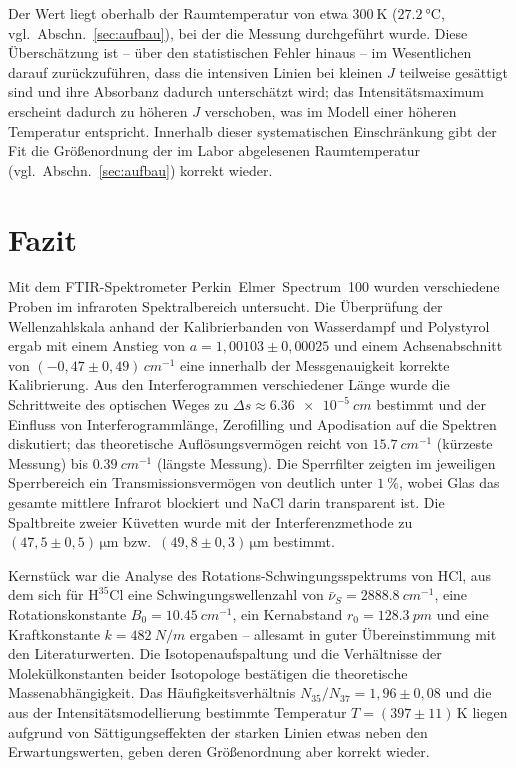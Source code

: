\documentclass[11pt,a4paper]{article}
\begin{document}
Der Wert liegt oberhalb der Raumtemperatur von etwa $\SI{300}{\kelvin}$
($\SI{27.2}{\celsius}$, vgl.\ Abschn.~\ref{sec:aufbau}), bei der die Messung
durchgeführt wurde. Diese Überschätzung ist -- über den statistischen Fehler
hinaus -- im Wesentlichen darauf zurückzuführen, dass die intensiven Linien bei
kleinen $J$ teilweise gesättigt sind und ihre Absorbanz dadurch unterschätzt
wird; das Intensitätsmaximum erscheint dadurch zu höheren $J$ verschoben, was im
Modell einer höheren Temperatur entspricht. Innerhalb dieser systematischen
Einschränkung gibt der Fit die Größenordnung der im Labor abgelesenen
Raumtemperatur (vgl.\ Abschn.~\ref{sec:aufbau}) korrekt wieder.

\section{Fazit}
\label{sec:fazit}

Mit dem FTIR-Spektrometer Perkin~Elmer~Spectrum~100 wurden verschiedene Proben im
infraroten Spektralbereich untersucht. Die Überprüfung der Wellenzahlskala anhand
der Kalibrierbanden von Wasserdampf und Polystyrol ergab mit einem Anstieg von
$a=1{,}00103 \pm 0{,}00025$ und einem Achsenabschnitt von $(-0{,}47\pm0{,}49)\,
\si{cm^{-1}}$ eine innerhalb der Messgenauigkeit korrekte Kalibrierung. Aus den
Interferogrammen verschiedener Länge wurde die Schrittweite des optischen Weges zu
$\Delta s \approx \SI{6.36e-5}{cm}$ bestimmt und der Einfluss von
Interferogrammlänge, Zerofilling und Apodisation auf die Spektren diskutiert; das
theoretische Auflösungsvermögen reicht von $\SI{15.7}{cm^{-1}}$ (kürzeste Messung)
bis $\SI{0.39}{cm^{-1}}$ (längste Messung). Die Sperrfilter zeigten im jeweiligen
Sperrbereich ein Transmissionsvermögen von deutlich unter $\SI{1}{\percent}$,
wobei Glas das gesamte mittlere Infrarot blockiert und NaCl darin transparent ist.
Die Spaltbreite zweier Küvetten wurde mit der Interferenzmethode zu $(47{,}5\pm
0{,}5)\,\si{\micro\metre}$ bzw.\ $(49{,}8\pm0{,}3)\,\si{\micro\metre}$ bestimmt.

Kernstück war die Analyse des Rotations-Schwingungsspektrums von HCl, aus dem sich
für $\mathrm{H}^{35}\mathrm{Cl}$ eine Schwingungswellenzahl von
$\bar\nu_S=\SI{2888.8}{cm^{-1}}$, eine Rotationskonstante $B_0=\SI{10.45}{cm^{-1}}$,
ein Kernabstand $r_0=\SI{128.3}{pm}$ und eine Kraftkonstante $k=\SI{482}{N/m}$
ergaben -- allesamt in guter Übereinstimmung mit den Literaturwerten. Die
Isotopenaufspaltung und die Verhältnisse der Molekülkonstanten beider Isotopologe
bestätigen die theoretische Massenabhängigkeit. Das Häufigkeitsverhältnis
$N_{35}/N_{37}=1{,}96\pm0{,}08$ und die aus der Intensitätsmodellierung bestimmte
Temperatur $T=(397\pm11)\,\si{\kelvin}$ liegen aufgrund von Sättigungseffekten der
starken Linien etwas neben den Erwartungswerten, geben deren Größenordnung aber
korrekt wieder.
\end{document}
